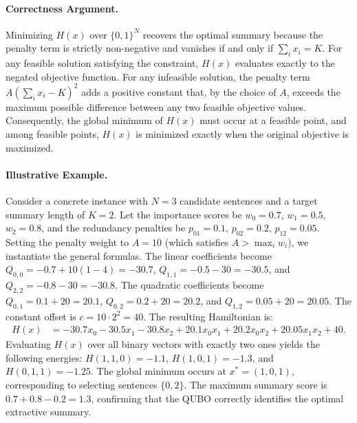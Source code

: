 \documentclass[12pt]{article}
\begin{document}
\paragraph{Correctness Argument.}
Minimizing $H(x)$ over $\{0,1\}^N$ recovers the optimal summary because the penalty term is strictly non-negative and vanishes if and only if $\sum_{i} x_i = K$. For any feasible solution satisfying the constraint, $H(x)$ evaluates exactly to the negated objective function. For any infeasible solution, the penalty term $A(\sum_{i} x_i - K)^2$ adds a positive constant that, by the choice of $A$, exceeds the maximum possible difference between any two feasible objective values. Consequently, the global minimum of $H(x)$ must occur at a feasible point, and among feasible points, $H(x)$ is minimized exactly when the original objective is maximized.

\paragraph{Illustrative Example.}
Consider a concrete instance with $N = 3$ candidate sentences and a target summary length of $K = 2$. Let the importance scores be $w_0 = 0.7$, $w_1 = 0.5$, $w_2 = 0.8$, and the redundancy penalties be $p_{01} = 0.1$, $p_{02} = 0.2$, $p_{12} = 0.05$. Setting the penalty weight to $A = 10$ (which satisfies $A > \max_i w_i$), we instantiate the general formulas. The linear coefficients become $Q_{0,0} = -0.7 + 10(1-4) = -30.7$, $Q_{1,1} = -0.5 - 30 = -30.5$, and $Q_{2,2} = -0.8 - 30 = -30.8$. The quadratic coefficients become $Q_{0,1} = 0.1 + 20 = 20.1$, $Q_{0,2} = 0.2 + 20 = 20.2$, and $Q_{1,2} = 0.05 + 20 = 20.05$. The constant offset is $c = 10 \cdot 2^2 = 40$. The resulting Hamiltonian is:
\begin{align}
    H(x) &= -30.7 x_0 - 30.5 x_1 - 30.8 x_2 + 20.1 x_0 x_1 + 20.2 x_0 x_2 + 20.05 x_1 x_2 + 40.
\end{align}
Evaluating $H(x)$ over all binary vectors with exactly two ones yields the following energies: $H(1,1,0) = -1.1$, $H(1,0,1) = -1.3$, and $H(0,1,1) = -1.25$. The global minimum occurs at $x^* = (1, 0, 1)$, corresponding to selecting sentences $\{0, 2\}$. The maximum summary score is $0.7 + 0.8 - 0.2 = 1.3$, confirming that the QUBO correctly identifies the optimal extractive summary.
\end{document}

